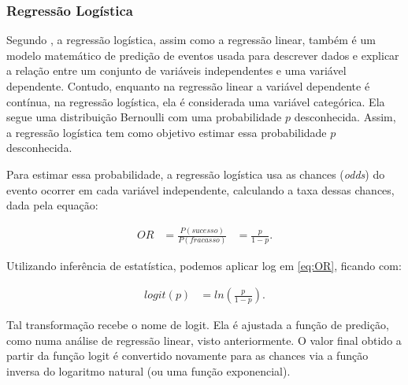 \subsubsection{Regressão Logística}

Segundo , a regressão logística, assim como a regressão linear, também é um modelo matemático de predição de eventos usada para descrever dados e explicar a relação entre um conjunto de variáveis independentes e uma variável dependente. Contudo, enquanto na regressão linear a variável dependente é contínua, na regressão logística, ela é considerada uma variável categórica. Ela segue uma distribuição Bernoulli\footnotemark {} com uma probabilidade \begin{math}p\end{math} desconhecida. Assim, a regressão logística tem como objetivo estimar essa probabilidade \begin{math}p\end{math} desconhecida.

Para estimar essa probabilidade, a regressão logística usa as chances (\emph{odds}) do evento ocorrer em cada variável independente, calculando a taxa dessas chances, dada pela equação:

\begin{equation}
  \label{eq:OR}
  \begin{aligned}
   OR &= \frac{P(sucesso)}{P(fracasso)}
     &= \frac{p}{1-p}.
  \end{aligned}
\end{equation}

Utilizando inferência de estatística, podemos aplicar log em \ref{eq:OR}, ficando com:

\begin{equation}
  \label{eq:t}
  \begin{aligned}
    logit(p) &= ln\left ( \frac{p}{1-p} \right ).
  \end{aligned}
\end{equation}

Tal transformação recebe o nome de logit. Ela é ajustada a função de predição, como numa análise de regressão linear, visto anteriormente. O valor final obtido a partir da função logit é convertido novamente para as chances via a função inversa do logaritmo natural (ou uma função exponencial).

